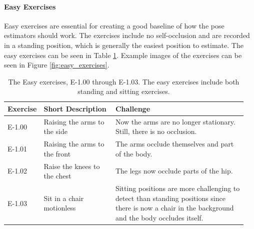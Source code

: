 \paragraph{Easy Exercises}

Easy exercises are essential for creating a good baseline of how the pose estimators should work. The exercises include no self-occlusion and are recorded in a standing position, which is generally the easiest position to estimate. The easy exercises can be seen in Table \ref{tab:easy_exercises}. Example images of the exercises can be seen in Figure \ref{fig:easy_exercises}.

\begin{table}[htb]
  \caption[Easy Exercises]{The Easy exercises, E-1.00 through E-1.03. The easy exercises include both standing and sitting exercises.}
  \label{tab:easy_exercises}
  \begin{tabular}{p{0.1\linewidth}p{0.3\linewidth}p{0.55\linewidth}}
  \hline
  \textbf{Exercise}& \textbf{Short Description}             & \textbf{Challenge} \\ \hline
  E-1.00   & Raising the arms to the side  & Now the arms are no longer stationary. Still, there is no occlusion. \\
  E-1.01   & Raising the arms to the front & The arms occlude themselves and part of the body.  \\
  E-1.02   & Raise the knees to the chest  & The legs now occlude parts of the hip.  \\
  E-1.03   & Sit in a chair motionless     & Sitting positions are more challenging to detect than standing positions since there is now a chair in the background and the body occludes itself.\\ \hline
  \end{tabular}
  \end{table}

